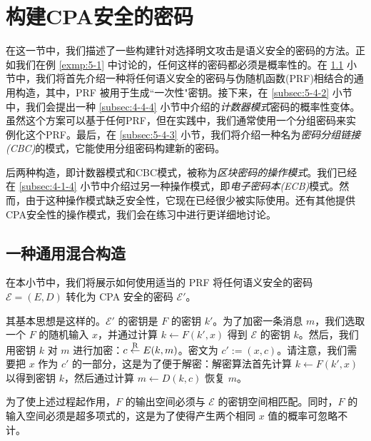 \section{构建CPA安全的密码}

在这一节中，我们描述了一些构建针对选择明文攻击是语义安全的密码的方法。正如我们在例 \ref{exmp:5-1} 中讨论的，任何这样的密码都必须是概率性的。在 \ref{subsec:5-4-1} 小节中，我们将首先介绍一种将任何语义安全的密码与伪随机函数(PRF)相结合的通用构造，其中，PRF 被用于生成``一次性"密钥。接下来，在 \ref{subsec:5-4-2} 小节中，我们会提出一种 \ref{subsec:4-4-4} 小节中介绍的\emph{计数器模式}密码的概率性变体。虽然这个方案可以基于任何PRF，但在实践中，我们通常使用一个分组密码来实例化这个PRF。最后，在 \ref{subsec:5-4-3} 小节，我们将介绍一种名为\emph{密码分组链接(CBC)}的模式，它能使用分组密码构建新的密码。

后两种构造，即计数器模式和CBC模式，被称为\emph{区块密码的操作模式}。我们已经在 \ref{subsec:4-1-4} 小节中介绍过另一种操作模式，即\emph{电子密码本(ECB)}模式。然而，由于这种操作模式缺乏安全性，它现在已经很少被实际使用。还有其他提供CPA安全性的操作模式，我们会在练习中进行更详细地讨论。


\subsection{一种通用混合构造}\label{subsec:5-4-1}

在本小节中，我们将展示如何使用适当的 PRF 将任何语义安全的密码 $\mathcal{E}=(E,D)$ 转化为 CPA 安全的密码 $\mathcal{E}'$。

其基本思想是这样的。$\mathcal{E}'$ 的密钥是 $F$ 的密钥 $k'$。为了加密一条消息 $m$，我们选取一个 $F$ 的随机输入 $x$，并通过计算 $k\leftarrow F(k',x)$ 得到 $\mathcal{E}$ 的密钥 $k$。然后，我们用密钥 $k$ 对 $m$ 进行加密：$c\overset{\rm R}\leftarrow E(k,m)$。密文为 $c':=(x,c)$。请注意，我们需要把 $x$ 作为 $c'$ 的一部分，这是为了便于解密：解密算法首先计算 $k\leftarrow F(k',x)$ 以得到密钥 $k$，然后通过计算 $m\leftarrow D(k,c)$ 恢复 $m$。

为了使上述过程起作用，$F$ 的输出空间必须与 $\mathcal{E}$ 的密钥空间相匹配。同时，$F$ 的输入空间必须是超多项式的，这是为了使得产生两个相同 $x$  值的概率可忽略不计。

